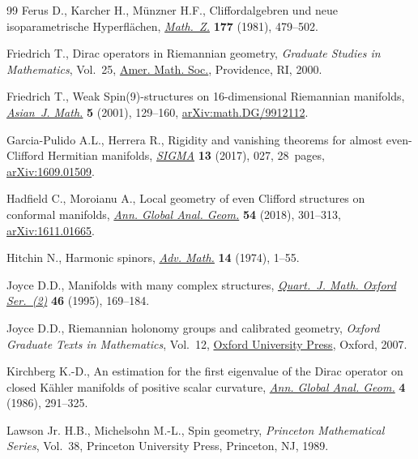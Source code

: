 \documentclass[10pt,a4paper]{amsart}
\numberwithin{equation}{section}
\begin{document}
\begin{thebibliography}{99}
Ferus D., Karcher H., M\"{u}nzner H.F., Cliffordalgebren und neue
 isoparametrische {H}yperfl\"{a}chen, \href{https://doi.org/10.1007/BF01219082}{\textit{Math.~Z.}} \textbf{177} (1981),
 479--502.

Friedrich T., Dirac operators in {R}iemannian geometry, \textit{Graduate
 Studies in Mathematics}, Vol.~25, \href{https://doi.org/10.1090/gsm/025}{Amer. Math. Soc.}, Providence, RI, 2000.

Friedrich T., Weak {S}pin(9)-structures on 16-dimensional {R}iemannian
 manifolds, \href{https://doi.org/10.4310/AJM.2001.v5.n1.a9}{\textit{Asian~J. Math.}} \textbf{5} (2001), 129--160,
 \href{https://arxiv.org/abs/math.DG/9912112}{arXiv:math.DG/9912112}.

Garcia-Pulido A.L., Herrera R., Rigidity and vanishing theorems for almost
 even-{C}lifford {H}ermitian manifolds, \href{https://doi.org/10.3842/SIGMA.2017.027}{\textit{SIGMA}} \textbf{13} (2017),
 027, 28~pages, \href{https://arxiv.org/abs/1609.01509}{arXiv:1609.01509}.

Hadfield C., Moroianu A., Local geometry of even {C}lifford structures on
 conformal manifolds, \href{https://doi.org/10.1007/s10455-018-9602-8}{\textit{Ann. Global Anal. Geom.}} \textbf{54} (2018),
 301--313, \href{https://arxiv.org/abs/1611.01665}{arXiv:1611.01665}.

Hitchin N., Harmonic spinors, \href{https://doi.org/10.1016/0001-8708(74)90021-8}{\textit{Adv. Math.}} \textbf{14} (1974), 1--55.

Joyce D.D., Manifolds with many complex structures, \href{https://doi.org/10.1093/qmath/46.2.169}{\textit{Quart.~J. Math.
 Oxford Ser.~(2)}} \textbf{46} (1995), 169--184.

Joyce D.D., Riemannian holonomy groups and calibrated geometry, \textit{Oxford
 Graduate Texts in Mathematics}, Vol.~12, \href{https://doi.org/10.1007/978-3-642-19004-9_1}{Oxford University Press}, Oxford,
 2007.

Kirchberg K.-D., An estimation for the first eigenvalue of the {D}irac operator
 on closed {K}\"{a}hler manifolds of positive scalar curvature, \href{https://doi.org/10.1007/BF00128050}{\textit{Ann.
 Global Anal. Geom.}} \textbf{4} (1986), 291--325.

Lawson Jr. H.B., Michelsohn M.-L., Spin geometry, \textit{Princeton Mathematical
 Series}, Vol.~38, Princeton University Press, Princeton, NJ, 1989.


\end{thebibliography}
\end{document}
